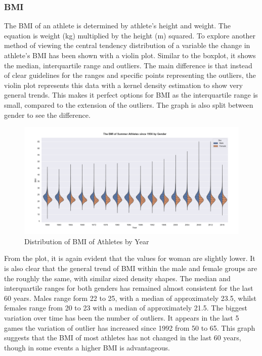 \documentclass[a4 paper, 12pt]{article}
\begin{document}
        \subsubsection{BMI}
        The BMI of an athlete is determined by athlete's height and weight. The equation is weight (kg) multiplied by the height (m) squared. To explore another method of viewing the central tendency distribution of a variable the change in athlete's BMI has been shown with a violin plot. Similar to the boxplot, it shows the median, interquartile range and outliers. The main difference is that instead of clear guidelines for the ranges and specific points representing the outliers, the violin plot represents this data with a kernel density estimation to show very general trends. This makes it perfect options for BMI as the interquartile range is small, compared to the extension of the outliers. The graph is also split between gender to see the difference. 
        \begin{figure} [H]
            \centering
            \includegraphics[width=\textwidth, frame]
                {./images/graph/athlete_BMI_violinplot.png}      
                \caption{Distribution of BMI of Athletes by Year} 
        \end{figure}
        From the plot, it is again evident that the values for woman are slightly lower. It is also clear that the general trend of BMI within the male and female groups are the roughly the same, with similar sized density shapes. The median and interquartile ranges for both genders has remained almost consistent for the last 60 years. Males range form 22 to 25, with a median of approximately 23.5, whilst females range from 20 to 23 with a median of approximately 21.5. The biggest variation over time has been the number of outliers. It appears in the last 5 games the variation of outlier has increased since 1992 from 50 to 65. This graph suggests that the BMI of most athletes has not changed in the last 60 years, though in some events a higher BMI is advantageous.
\end{document}
